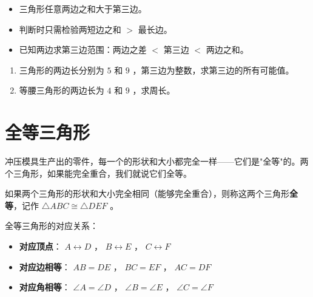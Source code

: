 \begin{keytakeaway}


\begin{itemize}
  \item 三角形任意两边之和大于第三边。
  \item 判断时只需检验两短边之和 $>$ 最长边。
  \item 已知两边求第三边范围：两边之差 $<$ 第三边 $<$ 两边之和。
\end{itemize}


\end{keytakeaway}

\begin{practice}


\begin{enumerate}
  \item 三角形的两边长分别为 $5$ 和 $9$ ，第三边为整数，求第三边的所有可能值。
  \item 等腰三角形的两边长为 $4$ 和 $9$ ，求周长。
\end{enumerate}


\end{practice}



\section*{全等三角形}


\begin{explore}


冲压模具生产出的零件，每一个的形状和大小都完全一样——它们是"全等"的。两个三角形，如果能完全重合，我们就说它们全等。

\end{explore}

\begin{understand}


如果两个三角形的形状和大小完全相同（能够完全重合），则称这两个三角形\textbf{全等}，记作 $\triangle ABC \cong \triangle DEF$ 。

全等三角形的对应关系：
\begin{itemize}
  \item \textbf{对应顶点}： $A \leftrightarrow D$ ， $B \leftrightarrow E$ ， $C \leftrightarrow F$
  \item \textbf{对应边相等}： $AB = DE$ ， $BC = EF$ ， $AC = DF$
  \item \textbf{对应角相等}： $\angle A = \angle D$ ， $\angle B = \angle E$ ， $\angle C = \angle F$
\end{itemize}


\end{understand}

